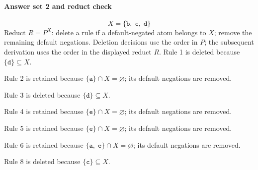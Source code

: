 \documentclass[a4paper,11pt]{article}
\newcommand{\at}[1]{\texttt{#1}}
\begin{document}
\paragraph{Answer set 2 and reduct check}
\[
X=\{\at{b},\;\at{c},\;\at{d}\}
\]
Reduct $R=P^X$: delete a rule if a default-negated atom belongs to $X$; remove the remaining default negations. Deletion decisions use the order in $P$; the subsequent derivation uses the order in the displayed reduct $R$.
Rule 1 is deleted because $\{\at{d}\}\subseteq X$.

Rule 2 is retained because $\{\at{a}\}\cap X=\varnothing$; its default negations are removed.

Rule 3 is deleted because $\{\at{d}\}\subseteq X$.

Rule 4 is retained because $\{\at{e}\}\cap X=\varnothing$; its default negations are removed.

Rule 5 is retained because $\{\at{e}\}\cap X=\varnothing$; its default negations are removed.

Rule 6 is retained because $\{\at{a},\;\at{e}\}\cap X=\varnothing$; its default negations are removed.

Rule 8 is deleted because $\{\at{c}\}\subseteq X$.
\end{document}
